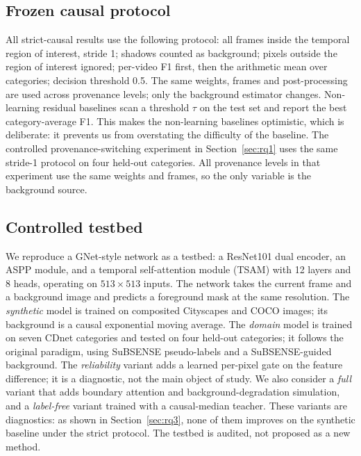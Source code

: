 \documentclass[sn-mathphys-num,iicol]{sn-jnl}
\begin{document}
\subsection{Frozen causal protocol}\label{sec:frozen}

All strict-causal results use the following protocol: all frames inside the
temporal region of interest, stride 1; shadows counted as background; pixels
outside the region of interest ignored; per-video F1 first, then the arithmetic
mean over categories; decision threshold 0.5. The same weights, frames and
post-processing are used across provenance levels; only the background estimator
changes. Non-learning residual baselines scan a threshold $\tau$ on the test set
and report the best category-average F1. This makes the non-learning baselines
optimistic, which is deliberate: it prevents us from overstating the difficulty
of the baseline. The controlled provenance-switching experiment in
Section~\ref{sec:rq1} uses the same stride-1 protocol on four held-out
categories. All provenance levels in that experiment use the same weights and
frames, so the only variable is the background source.

\subsection{Controlled testbed}\label{sec:testbed}

We reproduce a GNet-style network as a testbed: a ResNet101 dual encoder, an
ASPP module, and a temporal self-attention module (TSAM) with 12 layers and 8
heads, operating on $513\times513$ inputs. The network takes the current frame
and a background image and predicts a foreground mask at the same resolution.
The \emph{synthetic} model is trained on composited Cityscapes \cite{cityscapes2016}
and COCO \cite{coco2014} images; its background is a causal exponential moving
average. The \emph{domain} model is trained on seven CDnet categories and tested
on four held-out categories; it follows the original paradigm, using SuBSENSE
pseudo-labels and a SuBSENSE-guided background. The \emph{reliability} variant
adds a learned per-pixel gate on the feature difference; it is a diagnostic, not
the main object of study. We also consider a \emph{full} variant that adds
boundary attention and background-degradation simulation, and a \emph{label-free}
variant trained with a causal-median teacher. These variants are diagnostics: as
shown in Section~\ref{sec:rq3}, none of them improves on the synthetic baseline
under the strict protocol. The testbed is audited, not proposed as a new method.
\end{document}
